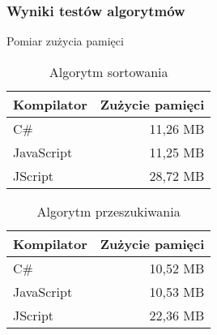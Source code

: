 \begin{frame}
  \frametitle{Wyniki testów algorytmów}
  \begin{block}{Pomiar zużycia pamięci}
    \scriptsize
    \begin{table}[h!]
      \centering
      \caption{Algorytm sortowania}
      \begin{tabular}{|l|r|}
      \hline
      Kompilator & Zużycie pamięci \\ \hline
      C\# & 11,26 MB \\ \hline
      JavaScript & 11,25 MB \\ \hline
      JScript & 28,72 MB \\ \hline
      \end{tabular}
    \end{table}
    \begin{table}[h!]
      \centering
      \caption{Algorytm przeszukiwania}
      \begin{tabular}{|l|r|}
      \hline
      Kompilator & Zużycie pamięci \\ \hline
      C\# & 10,52 MB \\ \hline
      JavaScript & 10,53 MB \\ \hline
      JScript & 22,36 MB \\ \hline
      \end{tabular}
    \end{table}
  \end{block}
\end{frame}

